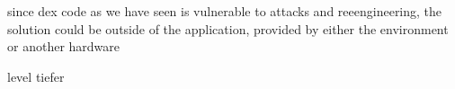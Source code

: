 since dex code as we have seen is vulnerable to attacks and reeengineering, the solution could be outside of the application, provided by either the environment or another hardware


level tiefer
